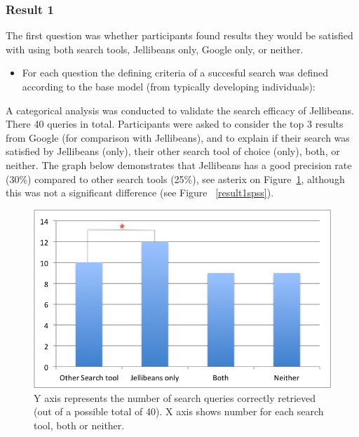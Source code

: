 \documentclass[a4paper, 11pt]{article}
\begin{document}
\subsubsection{Result 1}
The first question was whether participants found results they would be satisfied with using both search tools, Jellibeans only, Google only, or neither.

\vspace{5mm}
\begin{itemize}
\item{For each question the defining criteria of a succesful search was defined according to the base model (from typically developing individuals):}
\end{itemize}

A categorical analysis was conducted to validate the search efficacy of Jellibeans. There 40 queries in total. Participants were asked to consider the top 3 results from Google (for comparison with Jellibeans), and to explain if their search was satisfied by Jellibeans (only), their other search tool of choice (only), both, or neither. The graph below demonstrates that Jellibeans has a good precision rate (30\%) compared to other search tools (25\%), see asterix on Figure~\ref{result1}, although this was not a significant difference (see Figure ~\ref{result1spss}).
\begin{figure}[H]
\begin{center}
\includegraphics[scale=0.9]{Result1star}
\caption{Y axis represents the number of search queries correctly retrieved (out of a possible total of 40). X axis shows number for each search tool, both or neither.}
\label{result1}
\end{center}
\end{figure}
\end{document}
